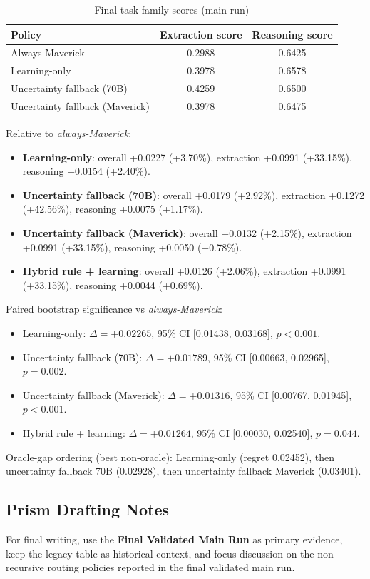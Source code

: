 \begin{table}[H]
\centering
\caption{Final task-family scores (main run)}
\begin{tabular}{lcc}
\toprule
Policy & Extraction score & Reasoning score \\
\midrule
Always-Maverick & 0.2988 & 0.6425 \\
Learning-only & 0.3978 & 0.6578 \\
Uncertainty fallback (70B) & 0.4259 & 0.6500 \\
Uncertainty fallback (Maverick) & 0.3978 & 0.6475 \\
\bottomrule
\end{tabular}
\end{table}

Relative to \textit{always-Maverick}:
\begin{itemize}
  \item \textbf{Learning-only}: overall +0.0227 (+3.70\%), extraction +0.0991 (+33.15\%), reasoning +0.0154 (+2.40\%).
  \item \textbf{Uncertainty fallback (70B)}: overall +0.0179 (+2.92\%), extraction +0.1272 (+42.56\%), reasoning +0.0075 (+1.17\%).
  \item \textbf{Uncertainty fallback (Maverick)}: overall +0.0132 (+2.15\%), extraction +0.0991 (+33.15\%), reasoning +0.0050 (+0.78\%).
  \item \textbf{Hybrid rule + learning}: overall +0.0126 (+2.06\%), extraction +0.0991 (+33.15\%), reasoning +0.0044 (+0.69\%).
\end{itemize}

Paired bootstrap significance vs \textit{always-Maverick}:
\begin{itemize}
  \item Learning-only: $\Delta=+0.02265$, 95\% CI [0.01438, 0.03168], $p<0.001$.
  \item Uncertainty fallback (70B): $\Delta=+0.01789$, 95\% CI [0.00663, 0.02965], $p=0.002$.
  \item Uncertainty fallback (Maverick): $\Delta=+0.01316$, 95\% CI [0.00767, 0.01945], $p<0.001$.
  \item Hybrid rule + learning: $\Delta=+0.01264$, 95\% CI [0.00030, 0.02540], $p=0.044$.
\end{itemize}

Oracle-gap ordering (best non-oracle): Learning-only (regret 0.02452), then uncertainty fallback 70B (0.02928), then uncertainty fallback Maverick (0.03401).

\subsection{Prism Drafting Notes}
For final writing, use the \textbf{Final Validated Main Run} as primary evidence, keep the legacy table as historical context,
and focus discussion on the non-recursive routing policies reported in the final validated main run.
